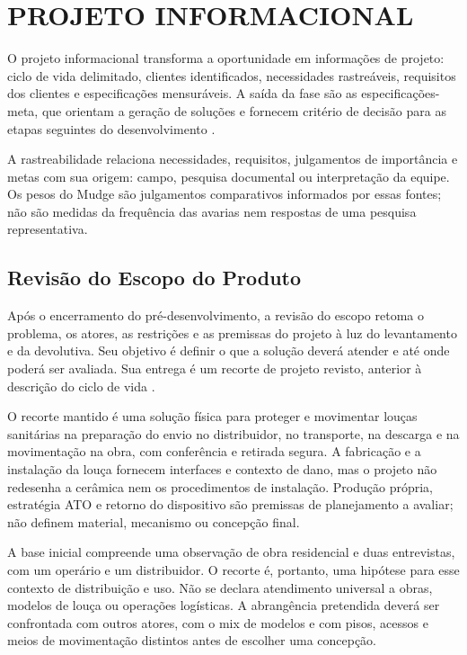 \clearpage
\section{PROJETO INFORMACIONAL}

O projeto informacional transforma a oportunidade em informações de projeto: ciclo de vida delimitado, clientes identificados, necessidades rastreáveis, requisitos dos clientes e especificações mensuráveis. A saída da fase são as especificações-meta, que orientam a geração de soluções e fornecem critério de decisão para as etapas seguintes do desenvolvimento \citep{rozenfeld2006,back2008}.

A rastreabilidade relaciona necessidades, requisitos, julgamentos de importância e metas com sua origem: campo, pesquisa documental ou interpretação da equipe. Os pesos do Mudge são julgamentos comparativos informados por essas fontes; não são medidas da frequência das avarias nem respostas de uma pesquisa representativa.

\subsection{Revisão do Escopo do Produto}
\label{sec:revisao-escopo}

Após o encerramento do pré-desenvolvimento, a revisão do escopo retoma o problema, os atores, as restrições e as premissas do projeto à luz do levantamento e da devolutiva. Seu objetivo é definir o que a solução deverá atender e até onde poderá ser avaliada. Sua entrega é um recorte de projeto revisto, anterior à descrição do ciclo de vida \citep{rozenfeld2006,back2008}.

O recorte mantido é uma solução física para proteger e movimentar louças sanitárias na preparação do envio no distribuidor, no transporte, na descarga e na movimentação na obra, com conferência e retirada segura. A fabricação e a instalação da louça fornecem interfaces e contexto de dano, mas o projeto não redesenha a cerâmica nem os procedimentos de instalação. Produção própria, estratégia ATO e retorno do dispositivo são premissas de planejamento a avaliar; não definem material, mecanismo ou concepção final.

A base inicial compreende uma observação de obra residencial e duas entrevistas, com um operário e um distribuidor. O recorte é, portanto, uma hipótese para esse contexto de distribuição e uso. Não se declara atendimento universal a obras, modelos de louça ou operações logísticas. A abrangência pretendida deverá ser confrontada com outros atores, com o mix de modelos e com pisos, acessos e meios de movimentação distintos antes de escolher uma concepção.

